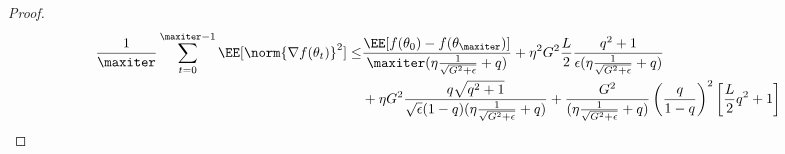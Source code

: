 \documentclass[11pt]{article}
\begin{document}
\begin{proof}
 \begin{align}
 \frac{1}{\maxiter}\sum_{t=0}^{\maxiter -1} \EE[\norm{\nabla f(\theta_t)}^2]  \leq &
 \frac{\EE[f(\theta_{0}) - f(\theta_{\maxiter})]}{\maxiter(\eta\frac{1}{\sqrt{G^2+\epsilon}} + q )} + \eta^2 G^2\frac{L}{2} \frac{q^2+1}{\epsilon(\eta\frac{1}{\sqrt{G^2+\epsilon}} + q)} \\
 & + \eta G^2 \frac{q\sqrt{q^2+1}}{\sqrt{\epsilon}(1-q)(\eta\frac{1}{\sqrt{G^2+\epsilon}} + q)}  +  \frac{G^2}{(\eta\frac{1}{\sqrt{G^2+\epsilon}} + q)} \left(\frac{q}{1-q}\right)^2 \left[ \frac{L}{2}q^2 + 1 \right]
  \end{align}


\end{proof}



\end{document}
